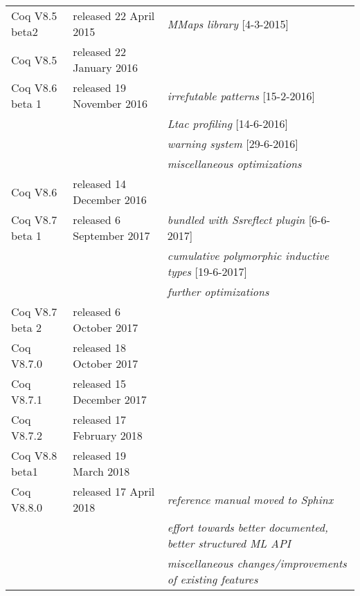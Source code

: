 \documentclass[a4paper]{book}
\newcommand{\feature}[1]{{\em #1}}
\begin{document}
\begin{tabular}{l|l|l}
Coq V8.5 beta2 & released 22 April 2015 & \feature{MMaps library} [4-3-2015]\\

Coq V8.5 & released 22 January 2016 & \\

Coq V8.6 beta 1 & released 19 November 2016 & \feature{irrefutable patterns} [15-2-2016]\\
&& \feature{Ltac profiling} [14-6-2016]\\
&& \feature{warning system} [29-6-2016]\\
&& \feature{miscellaneous optimizations}\\

Coq V8.6 & released 14 December 2016 & \\

Coq V8.7 beta 1 & released 6 September 2017 & \feature{bundled with Ssreflect plugin} [6-6-2017]\\
&& \feature{cumulative polymorphic inductive types} [19-6-2017]\\
&& \feature{further optimizations}\\

Coq V8.7 beta 2 & released 6 October 2017 & \\

Coq V8.7.0 & released 18 October 2017 & \\

Coq V8.7.1 & released 15 December 2017 & \\

Coq V8.7.2 & released 17 February 2018 & \\

Coq V8.8 beta1 & released 19 March 2018 & \\

Coq V8.8.0 & released 17 April 2018 & \feature{reference manual moved to Sphinx} \\
&& \feature{effort towards better documented, better structured ML API}\\
&& \feature{miscellaneous changes/improvements of existing features}\\

\end{tabular}

\medskip
\bigskip
\newpage
\end{document}
